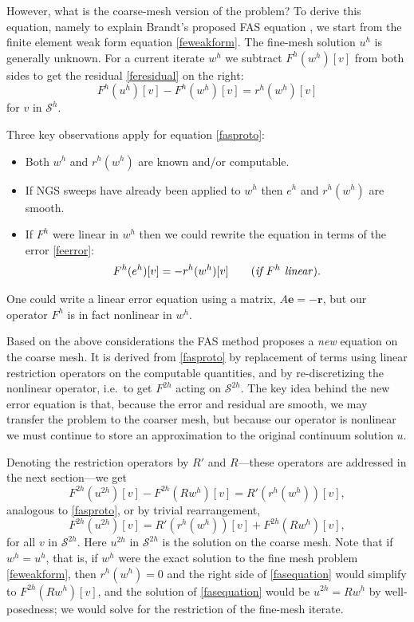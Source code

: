 \documentclass[letterpaper,final,12pt,reqno]{amsart}
\newcommand{\be}{\mathbf{e}}
\newcommand{\br}{\mathbf{r}}
\begin{document}
However, what is the coarse-mesh version of the problem?  To derive this equation, namely to explain Brandt's proposed FAS equation \cite{Brandt1977}, we start from the finite element weak form equation \eqref{feweakform}.  The fine-mesh solution $u^h$ is generally unknown.  For a current iterate $w^h$ we subtract $F^h(w^h)[v]$ from both sides to get the residual \eqref{feresidual} on the right:
\begin{equation}
  F^h(u^h)[v] - F^h(w^h)[v] = r^h(w^h)[v] \label{fasproto}
\end{equation}
for $v$ in $\mathcal{S}^h$.

Three key observations apply for equation \eqref{fasproto}:
\begin{itemize}
\item Both $w^h$ and $r^h(w^h)$ are known and/or computable.
\item If NGS sweeps have already been applied to $w^h$ then $e^h$ and $r^h(w^h)$ are smooth.
\item If $F^h$ were linear in $w^h$ then we could rewrite the equation in terms of the error \eqref{feerror}:
    $$F^h(e^h)[v] = -r^h(w^h)[v] \qquad (\text{\emph{if $F^h$ linear}}).$$
\end{itemize}
One could write a linear error equation using a matrix, $A\be=-\br$, but our operator $F^h$ is in fact nonlinear in $w^h$.

Based on the above considerations the FAS method proposes a \emph{new} equation on the coarse mesh.  It is derived from \eqref{fasproto} by replacement of terms using linear restriction operators on the computable quantities, and by re-discretizing the nonlinear operator, i.e.~to get $F^{2h}$ acting on $\mathcal{S}^{2h}$.  The key idea behind the new error equation is that, because the error and residual are smooth, we may transfer the problem to the coarser mesh, but because our operator is nonlinear we must continue to store an approximation to the original continuum solution $u$.

Denoting the restriction operators by $R'$ and $R$---these operators are addressed in the next section---we get
\begin{equation}
  F^{2h}(u^{2h})[v] - F^{2h}(R w^h)[v] = R' (r^h(w^h))[v], \label{faspreequation}
\end{equation}
analogous to \eqref{fasproto}, or by trivial rearrangement,
\begin{equation}
  F^{2h}(u^{2h})[v] = R' (r^h(w^h))[v] + F^{2h}(R w^h)[v], \label{fasequation}
\end{equation}
for all $v$ in $\mathcal{S}^{2h}$.  Here $u^{2h}$ in $\mathcal{S}^{2h}$ is the solution on the coarse mesh.  Note that if $w^h=u^h$, that is, if $w^h$ were the exact solution to the fine mesh problem \eqref{feweakform}, then $r^h(w^h)=0$ and the right side of \eqref{fasequation} would simplify to $F^{2h}(R w^h)[v]$, and the solution of \eqref{fasequation} would be $u^{2h} = R w^h$ by well-posedness; we would solve for the restriction of the fine-mesh iterate.
\end{document}
